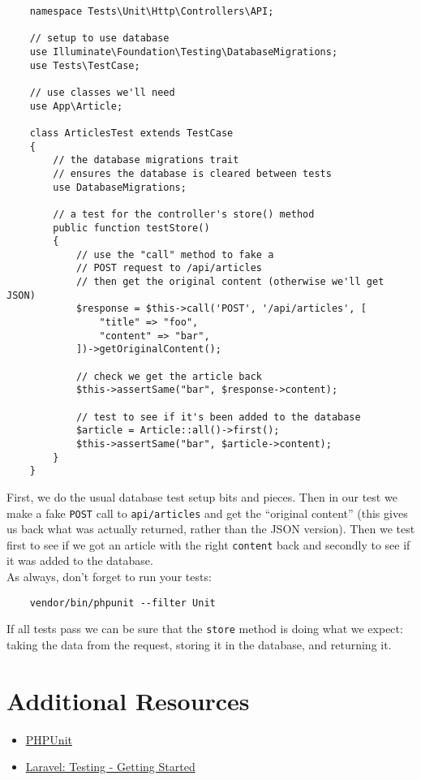 \begin{verbatim}
    namespace Tests\Unit\Http\Controllers\API;

    // setup to use database
    use Illuminate\Foundation\Testing\DatabaseMigrations;
    use Tests\TestCase;

    // use classes we'll need
    use App\Article;

    class ArticlesTest extends TestCase
    {
        // the database migrations trait
        // ensures the database is cleared between tests
        use DatabaseMigrations;

        // a test for the controller's store() method
        public function testStore()
        {
            // use the "call" method to fake a
            // POST request to /api/articles
            // then get the original content (otherwise we'll get JSON)
            $response = $this->call('POST', '/api/articles', [
                "title" => "foo",
                "content" => "bar",
            ])->getOriginalContent();

            // check we get the article back
            $this->assertSame("bar", $response->content);

            // test to see if it's been added to the database
            $article = Article::all()->first();
            $this->assertSame("bar", $article->content);
        }
    }
\end{verbatim}

First, we do the usual database test setup bits and pieces. Then in our test we make a fake \texttt{POST} call to \texttt{api/articles} and get the ``original content'' (this gives us back what was actually returned, rather than the JSON version). Then we test first to see if we got an article with the right \texttt{content} back and secondly to see if it was added to the database.
\\

As always, don't forget to run your tests:

\begin{verbatim}
    vendor/bin/phpunit --filter Unit
\end{verbatim}

If all tests pass we can be sure that the \texttt{store} method is doing what we expect: taking the data from the request, storing it in the database, and returning it.



\section{Additional Resources}

\begin{itemize}[leftmargin=*]
    \item \href{https://github.com/sebastianbergmann/phpunit}{PHPUnit}
    \item \href{http://laravel.com/docs/6.x/testing}{Laravel: Testing - Getting Started}
\end{itemize}
